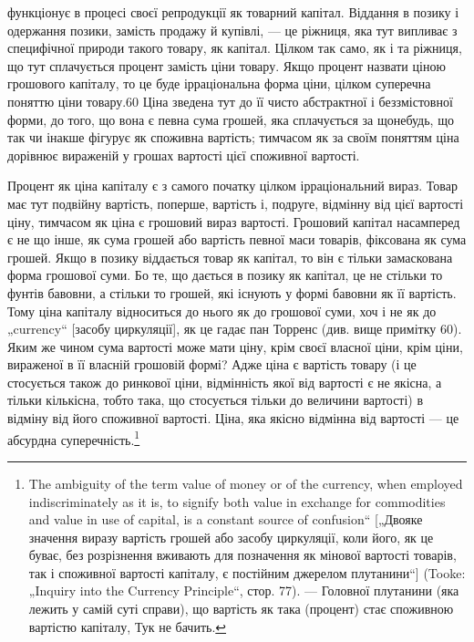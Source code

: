 \parcont{}  %
функціонує в процесі своєї репродукції як товарний капітал.
Віддання в позику і одержання позики, замість продажу й купівлі,
— це ріжниця, яка тут випливає з специфічної природи
такого товару, як капітал. Цілком так само, як і та ріжниця, що
тут сплачується процент замість ціни товару. Якщо процент
назвати ціною грошового капіталу, то це буде ірраціональна
форма ціни, цілком суперечна поняттю ціни товару.60 Ціна зведена
тут до її чисто абстрактної і беззмістовної форми, до того,
що вона є певна сума грошей, яка сплачується за щонебудь, що
так чи інакше фігурує як споживна вартість; тимчасом як за
своїм поняттям ціна дорівнює вираженій у грошах вартості цієї
споживної вартості.

Процент як ціна капіталу є з самого початку цілком ірраціональний
вираз. Товар має тут подвійну вартість, поперше, вартість
і, подруге, відмінну від цієї вартості ціну, тимчасом як ціна
є грошовий вираз вартості. Грошовий капітал насамперед є не
що інше, як сума грошей або вартість певної маси товарів, фіксована
як сума грошей. Якщо в позику віддається товар як
капітал, то він є тільки замаскована форма грошової суми. Бо
те, що дається в позику як капітал, це не стільки то фунтів
бавовни, а стільки то грошей, які існують у формі бавовни як
її вартість. Тому ціна капіталу відноситься до нього як до грошової
суми, хоч і не як до „currency“ [засобу циркуляції], як
це гадає пан Торренс (див. вище примітку 60). Яким же чином
сума вартості може мати ціну, крім своєї власної ціни, крім
ціни, вираженої в її власній грошовій формі? Адже ціна є вартість
товару (і це стосується також до ринкової ціни, відмінність
якої від вартості є не якісна, а тільки кількісна, тобто така, що
стосується тільки до величини вартості) в відміну від його
споживної вартості. Ціна, яка якісно відмінна від вартості —
це абсурдна суперечність.\footnote{
The ambiguity of the term value of money or of the currency, when employed
indiscriminately as it is, to signify both value in exchange for commodities
and value in use of capital, is a constant source of confusion“ [„Двояке значення
виразу вартість грошей або засобу циркуляції, коли його, як це буває, без
розрізнення вживають для позначення як мінової вартості товарів, так і споживної
вартості капіталу, є постійним джерелом плутанини“] (Tooke: „Inquiry
into the Currency Principle“, стор. 77). — Головної плутанини (яка лежить у самій
суті справи), що вартість як така (процент) стає споживною вартістю капіталу,
Тук не бачить.
}

